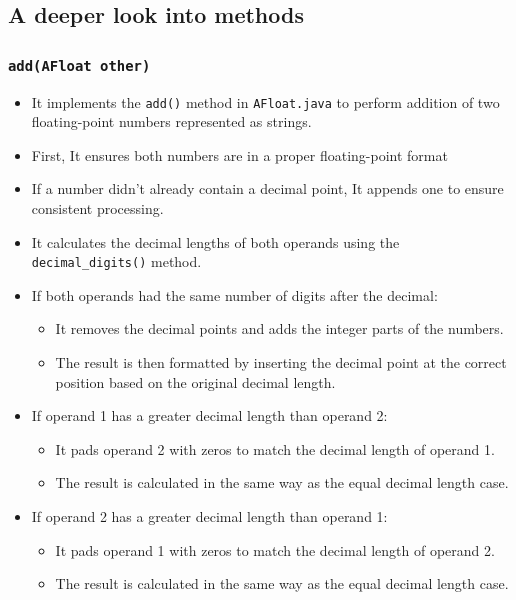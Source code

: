 \documentclass{article}
\begin{document}
\subsection*{A deeper look into methods}
\subsubsection*{\texttt{add(AFloat other)}}
\begin{itemize}
    \item It implements the \texttt{add()} method in \texttt{AFloat.java} to perform addition of two floating-point numbers represented as strings.
    \item First, It ensures both numbers are in a proper floating-point format
    \item If a number didn't already contain a decimal point, It appends one to ensure consistent processing.
    \item It calculates the decimal lengths of both operands using the \texttt{decimal\_digits()} method.
    \item If both operands had the same number of digits after the decimal:
        \begin{itemize}
            \item It removes the decimal points and adds the integer parts of the numbers.
            \item The result is then formatted by inserting the decimal point at the correct position based on the original decimal length.
        \end{itemize}
    \item If operand 1 has a greater decimal length than operand 2:
        \begin{itemize}
            \item It pads operand 2 with zeros to match the decimal length of operand 1.
            \item The result is calculated in the same way as the equal decimal length case.
        \end{itemize}
    \item If operand 2 has a greater decimal length than operand 1:
        \begin{itemize}
            \item It pads operand 1 with zeros to match the decimal length of operand 2.
            \item The result is calculated in the same way as the equal decimal length case.
        \end{itemize}

\end{itemize}
\end{document}
